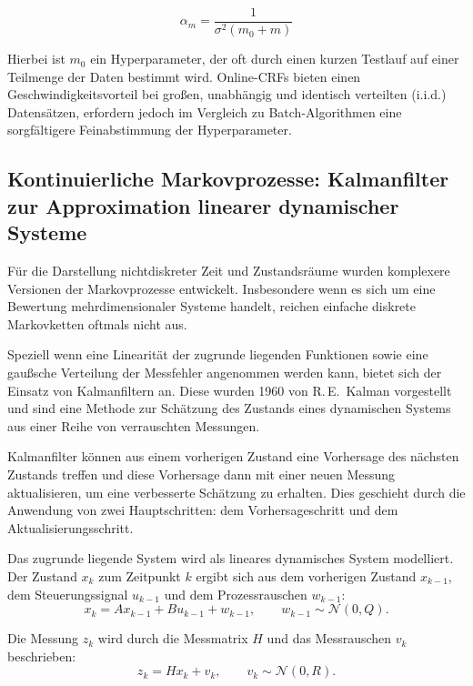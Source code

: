 \begin{equation}
\alpha_m = \frac{1}{\sigma^2(m_0 + m)}
\end{equation}

Hierbei ist $m_0$ ein Hyperparameter, der oft durch einen kurzen Testlauf auf einer Teilmenge der Daten bestimmt wird. Online-CRFs bieten einen Geschwindigkeitsvorteil bei großen, unabhängig und identisch verteilten (i.i.d.) Datensätzen, erfordern jedoch im Vergleich zu Batch-Algorithmen eine sorgfältigere Feinabstimmung der Hyperparameter. \cite{SuttonMcCallum2012}

\subsection{Kontinuierliche Markovprozesse: Kalmanfilter zur Approximation linearer dynamischer Systeme}

Für die Darstellung nichtdiskreter Zeit und Zustandsräume wurden komplexere Versionen der Markovprozesse entwickelt.
Insbesondere wenn es sich um eine Bewertung mehrdimensionaler Systeme handelt, reichen einfache diskrete Markovketten oftmals nicht aus.

Speziell wenn eine Linearität der zugrunde liegenden Funktionen sowie eine gaußsche Verteilung der Messfehler angenommen werden kann, bietet sich der Einsatz von Kalmanfiltern an. 
Diese wurden 1960 von R.\,E.~Kalman vorgestellt \cite{kalman1960new} und sind eine Methode zur Schätzung des Zustands eines dynamischen Systems aus einer Reihe von verrauschten Messungen.

Kalmanfilter können aus einem vorherigen Zustand eine Vorhersage des nächsten Zustands treffen und diese Vorhersage dann mit einer neuen Messung aktualisieren, um eine verbesserte Schätzung zu erhalten. 
Dies geschieht durch die Anwendung von zwei Hauptschritten: dem Vorhersageschritt und dem Aktualisierungsschritt.

Das zugrunde liegende System wird als lineares dynamisches System modelliert. 
Der Zustand $x_k$ zum Zeitpunkt $k$ ergibt sich aus dem vorherigen Zustand $x_{k-1}$, dem Steuerungssignal $u_{k-1}$ und dem Prozessrauschen $w_{k-1}$:
\begin{equation}
  x_k = A x_{k-1} + B u_{k-1} + w_{k-1}, 
  \qquad w_{k-1} \sim \mathcal{N}(0, Q).
\end{equation}

Die Messung $z_k$ wird durch die Messmatrix $H$ und das Messrauschen $v_k$ beschrieben:
\begin{equation}
  z_k = H x_k + v_k, 
  \qquad v_k \sim \mathcal{N}(0, R).
\end{equation}

